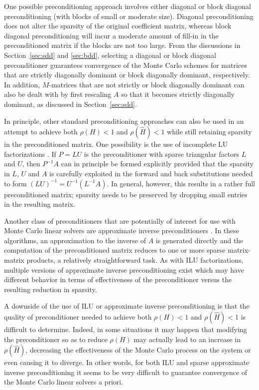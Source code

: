 \documentclass[times]{nlaauth}
\begin{document}
One possible preconditioning approach involves either diagonal or block
diagonal preconditioning (with blocks of small or moderate size). Diagonal
preconditioning does not alter the sparsity of the original coefficient matrix,
whereas block diagonal preconditioning will incur a moderate amount of
fill-in in the preconditioned matrix if the blocks are not too large.
From the discussions in Section~\ref{sec:sdd}
and \ref{sec:bdd}, selecting a diagonal or block diagonal preconditioner
guarantees convergence of the Monte Carlo schemes
for matrices that are strictly diagonally dominant
or block diagonally dominant, respectively. In addition, $M$-matrices
that are not strictly or block diagonally dominant can also be dealt with by
first rescaling $A$ so that it becomes strictly diagonally dominant, as
discussed in Section~\ref{sec:sdd}.

In principle,
other standard preconditioning approaches can also be used in an attempt
to achieve both $\rho(H)<1$ and $\rho(\hat{H})<1$ while still retaining
sparsity in the preconditioned matrix.  One possibility is the use of incomplete
LU factorizations \cite{Benzi2002,Saad}.  If $P=LU$ is the preconditioner
with sparse triangular factors $L$ and $U$, then $P^{-1}A$ can in principle
be formed explicitly
provided that the sparsity in $L$, $U$ and $A$
is carefully exploited in the forward and back substitutions
needed to form $(LU)^{-1}=U^{-1}(L^{-1}A)$. In general,
however, this results in a
rather full preconditioned matrix; sparsity needs to be preserved by dropping
small entries in
the resulting matrix.

Another class of preconditioners that are potentially of interest
for use with Monte Carlo
linear solvers are approximate inverse preconditioners
\cite{Benzi2002}.  In these algorithms, an approximation
to the inverse of $A$ is generated directly and the computation of the
preconditioned matrix reduces to one or more sparse matrix-matrix products,
a relatively
straightforward task.  As with ILU factorizations,
multiple versions of approximate inverse preconditioning exist which may
have different behavior in terms of effectiveness of the preconditioner
versus the resulting reduction in sparsity.

A downside of the use of ILU or approximate inverse preconditioning is that
the quality of preconditioner needed to achieve both $\rho(H)<1$
and $\rho(\hat{H})<1$ is difficult to determine.
Indeed, in some situations it may happen that
modifying the preconditioner so as to reduce $\rho(H)$ may actually lead to an
increase in $\rho(\hat{H})$, decreasing the effectiveness of the Monte
Carlo process on the system or even causing it to diverge.
In other words, for both ILU and sparse approximate inverse
preconditioning it seems to be very difficult to guarantee convergence
of the Monte Carlo linear solvers a priori.
\end{document}
